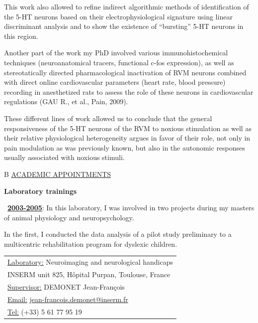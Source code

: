 \documentclass[a4paper,12pt,oneside]{letter}
\begin{document}
{This work also allowed to refine indirect algorithmic methods of identification of the 5-HT neurons based on their electrophysiological signature using linear discriminant analysis and to show the existence of “bursting” 5-HT neurons in this region.

Another part of the work my PhD involved various immunohistochemical techniques (neuroanatomical tracers, functional c-fos expression), as well as stereotatically directed pharmacological inactivation of RVM neurons combined with direct online cardiovascular parameters (heart rate, blood pressure) recording in anesthetized rats to assess the role of these neurons in cardiovascular regulations (GAU R., et al., Pain, 2009). 

These different lines of work allowed us to conclude that the general responsiveness of the 5-HT neurons of the RVM to noxious stimulation as well as their relative physiological heterogeneity argues in favor of their role, not only in pain modulation as was previously known, but also in the autonomic responses usually associated with noxious stimuli.


\begin{tabular}{B}
\underline{ACADEMIC APPOINTMENTS}
\end{tabular}

\begin{center}
\Large\textbf{Laboratory trainings}
\end{center}
\begin{minipage}[c]{7.7cm}
\textbullet~\underline{\textbf{2003-2005}}: In this laboratory, I was involved in two projects during my masters of animal physiology and neuropsychology.

\medskip

In the first, I conducted the data analysis of a pilot study preliminary to a multicentric rehabilitation program for dyslexic children.
\end{minipage}
\hfill
\begin{minipage}[c]{10cm}
\setlength\minrowclearance{0.2cm}
\setlength\arrayrulewidth{1.5pt}
\small
\begin{tabular}[t]{|l|}\hline
\underline{Laboratory:} Neuroimaging and neurological handicaps\\
INSERM unit 825, Hôpital Purpan, Toulouse, France\\
\underline{Supervisor:} DEMONET Jean-François\\
\underline{Email:} \href{mailto:jean-francois.demonet@inserm.fr}{jean-francois.demonet@inserm.fr}\\
\underline{Tel:} (+33) 5 61 77 95 19 \\ \hline
\end{tabular}
\end{minipage}

}
\end{document}

